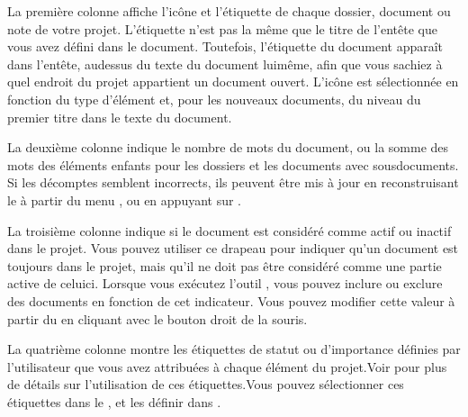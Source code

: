 \documentclass[a4paper,11pt,french]{sphinxmanual}
\begin{document}
\begin{description}
\sphinxAtStartPar
La première colonne affiche l’icône et l’étiquette de chaque dossier, document ou note de votre projet. L’étiquette n’est pas la même que le titre de l’en\sphinxhyphen{}tête que vous avez défini dans le document. Toutefois, l’étiquette du document apparaît dans l’en\sphinxhyphen{}tête, au\sphinxhyphen{}dessus du texte du document lui\sphinxhyphen{}même, afin que vous sachiez à quel endroit du projet appartient un document ouvert. L’icône est sélectionnée en fonction du type d’élément et, pour les nouveaux documents, du niveau du premier titre dans le texte du document.

\sphinxAtStartPar
La deuxième colonne indique le nombre de mots du document, ou la somme des mots des éléments enfants pour les dossiers et les documents avec sous\sphinxhyphen{}documents. Si les décomptes semblent incorrects, ils peuvent être mis à jour en reconstruisant le {\hyperref[\detokenize{int_glossary:term-Project-Index}]{}} à partir du menu , ou en appuyant sur .

\sphinxAtStartPar
La troisième colonne indique si le document est considéré comme actif ou inactif dans le projet. Vous pouvez utiliser ce drapeau pour indiquer qu’un document est toujours dans le projet, mais qu’il ne doit pas être considéré comme une partie active de celui\sphinxhyphen{}ci. Lorsque vous exécutez l’outil , vous pouvez inclure ou exclure des documents en fonction de cet indicateur. Vous pouvez modifier cette valeur à partir du {\hyperref[\detokenize{int_glossary:term-Context-Menu}]{}} en cliquant avec le bouton droit de la souris.

\sphinxAtStartPar
La quatrième colonne montre les étiquettes de statut ou d’importance définies par l’utilisateur que vous avez attribuées à chaque élément du projet.Voir {\hyperref[\detokenize{usage_project:a-ui-tree-status}]{}} pour plus de détails sur l’utilisation de ces étiquettes.Vous pouvez sélectionner ces étiquettes dans le {\hyperref[\detokenize{int_glossary:term-Context-Menu}]{}}, et les définir dans .

\end{description}
\end{document}
